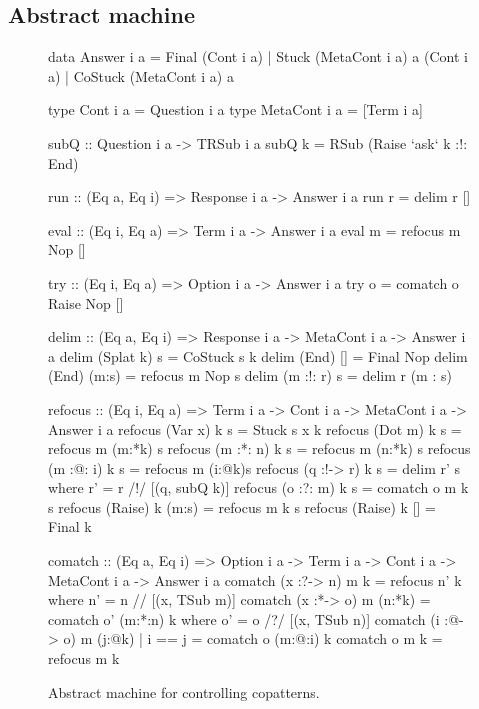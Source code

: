 \documentclass[sigplan,screen]{acmart}
\newcommand{\basicstylesize}{\small}
\begin{document}
\subsection{Abstract machine}

\begin{figure}
\centering
\renewcommand{\basicstylesize}{\footnotesize}
\begin{haskell}
data Answer i a
  = Final   (Cont i a)
  | Stuck   (MetaCont i a) a (Cont i a)
  | CoStuck (MetaCont i a) a

type Cont     i a = Question i a
type MetaCont i a = [Term i a]

subQ :: Question i a -> TRSub i a
subQ k = RSub (Raise `ask` k :!: End)

run :: (Eq a, Eq i) => Response i a
    -> Answer i a
run r = delim r []

eval :: (Eq i, Eq a) => Term i a
     -> Answer i a
eval m = refocus m Nop []

try :: (Eq i, Eq a) => Option i a
    -> Answer i a
try o = comatch o Raise Nop []

delim :: (Eq a, Eq i)
      => Response i a -> MetaCont i a
      -> Answer i a
delim (Splat k) s     = CoStuck s k
delim (End)     []    = Final Nop
delim (End)     (m:s) = refocus m Nop s
delim (m :!: r) s     = delim r (m : s)

refocus :: (Eq i, Eq a)
        => Term i a -> Cont i a -> MetaCont i a
        -> Answer i a
refocus (Var x)    k s = Stuck s x k
refocus (Dot m)    k s = refocus m (m:*k) s
refocus (m :*: n)  k s = refocus m (n:*k) s
refocus (m :@: i)  k s = refocus m (i:@k)s 
refocus (q :!-> r) k s = delim r' s
  where r' = r /!/ [(q, subQ k)]
refocus (o :?: m)  k s = comatch o m k s
refocus (Raise)    k (m:s) = refocus m k s
refocus (Raise)    k []    = Final k

comatch :: (Eq a, Eq i)
        => Option i a -> Term i a
        -> Cont i a -> MetaCont i a
        -> Answer i a
comatch (x :?-> n) m k      = refocus n' k
  where n' = n // [(x, TSub m)]
comatch (x :*-> o) m (n:*k) = comatch o' (m:*:n) k
  where o' = o /?/ [(x, TSub n)]
comatch (i :@-> o) m (j:@k)
  | i == j                  = comatch o (m:@:i) k
comatch o          m k      = refocus m k
\end{haskell}
\caption{Abstract machine for controlling copatterns.}
\label{fig:nest-machine-code}
\end{figure}
\end{document}
